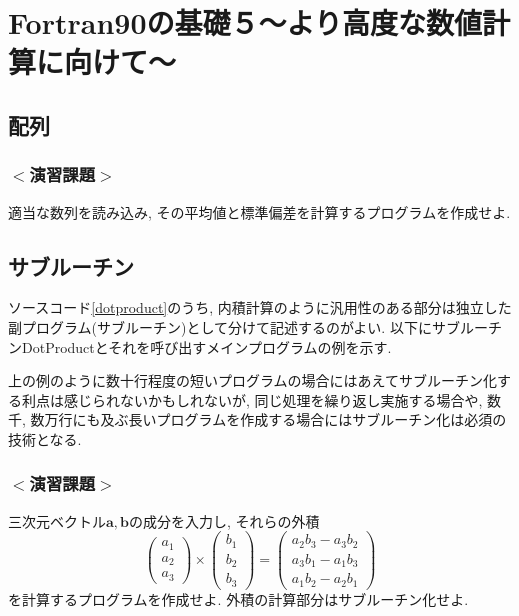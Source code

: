 \documentclass[a4j]{jsbook}
\begin{document}
\chapter{Fortran90の基礎５〜より高度な数値計算に向けて〜}
\section{配列}




\subsection*{$<$演習課題$>$}
適当な数列を読み込み, その平均値と標準偏差を計算するプログラムを作成せよ.

\section{サブルーチン}
ソースコード\ref{dotproduct}のうち,
内積計算のように汎用性のある部分は独立した副プログラム(サブルーチン)として分けて記述するのがよい.
以下にサブルーチンDotProductとそれを呼び出すメインプログラムの例を示す.

上の例のように数十行程度の短いプログラムの場合にはあえてサブルーチン化する利点は感じられないかもしれないが,
同じ処理を繰り返し実施する場合や,
数千, 数万行にも及ぶ長いプログラムを作成する場合にはサブルーチン化は必須の技術となる.


\subsection*{$<$演習課題$>$}
三次元ベクトル$\bm{a}, \bm{b}$の成分を入力し, それらの外積
\begin{equation}
\begin{pmatrix}
a_1 \\ a_2 \\ a_3
\end{pmatrix}
\times
\begin{pmatrix}
b_1 \\ b_2 \\ b_3
\end{pmatrix}
=
\begin{pmatrix}
a_2b_3-a_3b_2 \\ a_3b_1-a_1b_3 \\ a_1b_2-a_2b_1
\end{pmatrix}
\end{equation}
を計算するプログラムを作成せよ.
外積の計算部分はサブルーチン化せよ.
%
\end{document}

